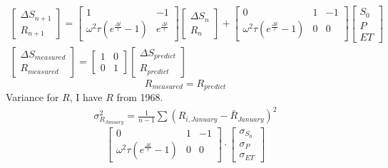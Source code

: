 \begin{gather*}
	\begin{bmatrix}
		\Delta S_{n+1} \\
		R_{n+1}
	\end{bmatrix} = \begin{bmatrix}
	1 & -1 \\
	\omega^2 \tau (e^{\frac{\Delta t}{\tau}} - 1) & e^{\frac{\Delta t}{\tau}} \end{bmatrix} \begin{bmatrix}
		\Delta S_{n} \\
		R_{n}
	\end{bmatrix} + \begin{bmatrix}
	0 & 1 & -1\\
	\omega^2 \tau (e^{\frac{\Delta t}{\tau}} - 1) & 0 & 0
\end{bmatrix} \begin{bmatrix}
S_0 \\
P \\
ET
\end{bmatrix} \\
\begin{bmatrix}
	\Delta S_{measured} \\
	R_{measured}
\end{bmatrix} = \begin{bmatrix}
	1 & 0 \\
	0 & 1
\end{bmatrix} \begin{bmatrix}
	\Delta S_{predict} \\
	R_{predict} 
\end{bmatrix} 
\end{gather*}
\begin{equation*}
	R_{measured} = R_{predict} 
\end{equation*}
Variance for $R$, I have $R$ from 1968.
\begin{gather*}
	\sigma^2_{R_{January}} = \frac{1}{n-1}\sum (R_{i,January} - \bar{R}_{January})^2
\end{gather*}
\begin{equation*}
	\begin{bmatrix}
		0 & 1 & -1\\
		\omega^2 \tau (e^{\frac{\Delta t}{\tau}} - 1) & 0 & 0
	\end{bmatrix} \cdot \begin{bmatrix}
	\sigma_{S_{0}}\\
	\sigma_{P}\\
	\sigma_{ET}
\end{bmatrix}
\end{equation*}